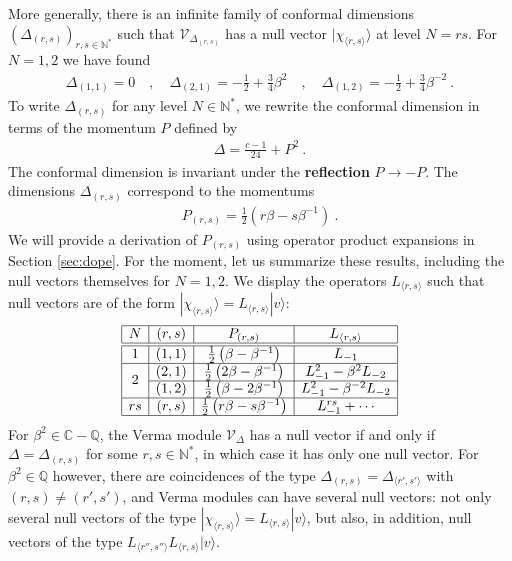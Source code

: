 \documentclass[12pt, a4paper]{article}
\theoremstyle{break}
\begin{document}
More generally, there is an infinite family of conformal dimensions $(\Delta_{(r, s)})_{r,s\in\mathbb{N}^*}$ such that $\mathcal{V}_{\Delta_{(r, s)}}$ has a null vector $|\chi_{\langle r,s\rangle}\rangle $ at level $N=rs$. For $N=1,2$ we have found 
\begin{align}
 \Delta_{(1, 1)} = 0 \quad, \quad \Delta_{(2, 1)} = -\frac12 + \frac34\beta^2 \quad , \quad \Delta_{(1, 2)} = -\frac12 + \frac34 \beta^{-2} \ . 
\end{align}
To write $\Delta_{(r, s)}$ for any level $N\in\mathbb{N}^*$, we rewrite the conformal dimension in terms of the momentum $P$ defined by 
\begin{align}
 \boxed{\Delta = \frac{c-1}{24} + P^2}\ .
 \label{dp}
\end{align}
The conformal dimension is invariant under the \textbf{reflection} $P\to -P$. The dimensions $\Delta_{(r, s)}$ correspond to the momentums 
\begin{align}
 \boxed{P_{(r, s)} = \frac12\left(r\beta -s\beta^{-1}\right)}\ .
 \label{prs}
\end{align}
We will provide a derivation of $P_{(r, s)}$ using operator product expansions in Section \ref{sec:dope}. For the moment, let us summarize these results, including the null vectors themselves for $N=1,2$. We display the operators $L_{\langle r,s\rangle}$ such that null vectors are of the form $|\chi_{\langle r,s\rangle}\rangle = L_{\langle r,s\rangle} |v\rangle$:
\begin{align}
\begin{array}{|c|c|c|c|}
\hline 
N & (r, s) & P_{(r, s)} &  L_{\langle r,s\rangle} 
\\
\hline\hline
1 & (1, 1) & \frac12\left(\beta -\beta^{-1}\right) &  L_{-1}
\\
\hline
\multirow{2}{*}{2} & 
(2, 1) & \frac12\left(2\beta -\beta^{-1}\right)  & L_{-1}^2 -\beta^{2} L_{-2}
\\
\cline{2-4}
& (1, 2) & \frac12\left(\beta -2\beta^{-1}\right) & L_{-1}^2 -\beta^{-2} L_{-2} 
\\
\hline
rs & (r, s) &  \frac12\left(r\beta -s\beta^{-1}\right) & L_{-1}^{rs} + \cdots 
\\
\hline
\end{array}
\label{eq:ars}
\end{align}
For $\beta^2\in\mathbb{C}-\mathbb{Q}$, the Verma module $\mathcal{V}_\Delta$ has a null vector if and only if $\Delta=\Delta_{(r, s)}$ for some $r,s\in\mathbb{N}^*$, in which case it has only one null vector. For $\beta^2\in\mathbb{Q}$ however, there are coincidences of the type $\Delta_{(r, s)}=\Delta_{\langle r',s'\rangle}$ with $(r,s)\neq (r',s')$, and Verma modules can have several null vectors: not only several null vectors of the type $|\chi_{\langle r,s\rangle}\rangle= L_{\langle r,s\rangle} |v\rangle$, but also, in addition, null vectors of the type  $L_{\langle r'',s''\rangle}L_{\langle r,s\rangle} |v\rangle$.
\end{document}
